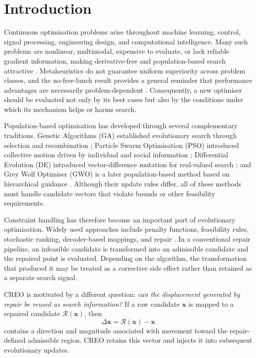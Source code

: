 \documentclass[journal]{IEEEtran}
\begin{document}
\section{Introduction}

Continuous optimisation problems arise throughout machine learning, control, signal processing, engineering design, and computational intelligence. Many such problems are nonlinear, multimodal, expensive to evaluate, or lack reliable gradient information, making derivative-free and population-based search attractive \cite{yang2010engineering,talbi2009metaheuristics,nocedal2006numerical}. Metaheuristics do not guarantee uniform superiority across problem classes, and the no-free-lunch result provides a general reminder that performance advantages are necessarily problem-dependent \cite{wolpert1997nfl}. Consequently, a new optimiser should be evaluated not only by its best cases but also by the conditions under which its mechanism helps or harms search.

Population-based optimisation has developed through several complementary traditions. Genetic Algorithms (GA) established evolutionary search through selection and recombination \cite{holland1992adaptation}; Particle Swarm Optimisation (PSO) introduced collective motion driven by individual and social information \cite{kennedy1995particle}; Differential Evolution (DE) introduced vector-difference mutation for real-valued search \cite{storn1997differential}; and Grey Wolf Optimiser (GWO) is a later population-based method based on hierarchical guidance \cite{mirjalili2014grey}. Although their update rules differ, all of these methods must handle candidate vectors that violate bounds or other feasibility requirements.

Constraint handling has therefore become an important part of evolutionary optimisation. Widely used approaches include penalty functions, feasibility rules, stochastic ranking, decoder-based mappings, and repair \cite{coello2002theoretical,deb2000efficient,runarsson2000stochastic,mezura2011constraint,michalewicz1996constrained,koziel1999homomorphous}. In a conventional repair pipeline, an infeasible candidate is transformed into an admissible candidate and the repaired point is evaluated. Depending on the algorithm, the transformation that produced it may be treated as a corrective side effect rather than retained as a separate search signal.

CREO is motivated by a different question: \emph{can the displacement generated by repair be reused as search information?} If a raw candidate $\mathbf{x}$ is mapped to a repaired candidate $\mathcal{R}(\mathbf{x})$, then
\begin{equation}
\Delta \mathbf{x}=\mathcal{R}(\mathbf{x})-\mathbf{x}
\end{equation}
contains a direction and magnitude associated with movement toward the repair-defined admissible region. CREO retains this vector and injects it into subsequent evolutionary updates.
\end{document}
